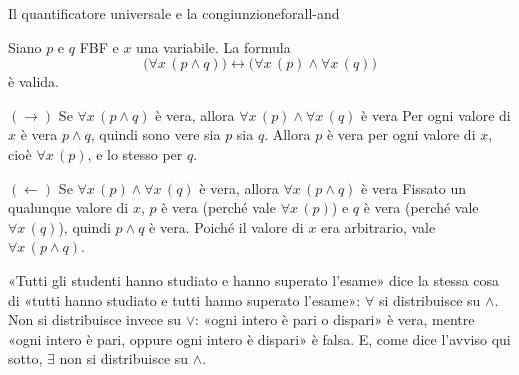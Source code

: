 \begin{concetto}
\begin{Proposizione}{Il quantificatore universale e la congiunzione}{forall-and}
    \begin{prerequisiti}
    \end{prerequisiti}
    Siano $p$ e $q$ FBF e $x$ una variabile. La formula
    \[ \big(\forall x\,(p \wedge q)\big) \leftrightarrow \big(\forall x\,(p) \wedge \forall x\,(q)\big) \]
    è valida.
\end{Proposizione}
\begin{dimostrazione}
    \begin{caso}{$(\rightarrow)$ Se $\forall x\,(p \wedge q)$ è vera, allora $\forall x\,(p) \wedge \forall x\,(q)$ è vera}
        Per ogni valore di $x$ è vera $p \wedge q$, quindi sono vere sia $p$ sia $q$. Allora $p$ è vera per ogni valore di $x$,
        cioè $\forall x\,(p)$, e lo stesso per $q$.
    \end{caso}
    \begin{caso}{$(\leftarrow)$ Se $\forall x\,(p) \wedge \forall x\,(q)$ è vera, allora $\forall x\,(p \wedge q)$ è vera}
        Fissato un qualunque valore di $x$, $p$ è vera (perché vale $\forall x\,(p)$) e $q$ è vera (perché vale $\forall x\,(q)$),
        quindi $p \wedge q$ è vera. Poiché il valore di $x$ era arbitrario, vale $\forall x\,(p \wedge q)$.
    \end{caso}
\end{dimostrazione}
\end{concetto}

\begin{spiegazione}
    «Tutti gli studenti hanno studiato e hanno superato l'esame» dice la stessa cosa di «tutti hanno studiato e tutti hanno superato l'esame»:
    $\forall$ si distribuisce su $\wedge$. Non si distribuisce invece su $\vee$: «ogni intero è pari o dispari» è vera, mentre «ogni intero è pari, oppure
    ogni intero è dispari» è falsa. E, come dice l'avviso qui sotto, $\exists$ non si distribuisce su $\wedge$.
\end{spiegazione}



